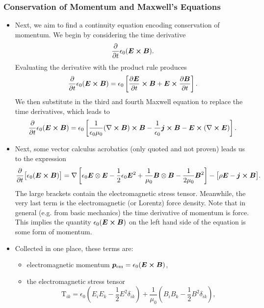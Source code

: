 \documentclass[11pt, a4paper]{article}
\renewcommand{\vec}[1]{\bm{#1}} %
\newcommand{\E}{\vec{E}} %
\newcommand{\B}{\vec{B}} %
\newcommand{\TT}{\mathrm{T}}  %
\newcommand{\ee}{\epsilon_{0}}  %
\newcommand{\mm}{\mu_{0}}  %
\renewcommand{\j}{\vec{j}}  %
\renewcommand{\curl}{\nabla \cross}
\renewcommand{\grad}{\nabla}
\begin{document}
\subsubsection{Conservation of Momentum and Maxwell's Equations}
\begin{itemize}
	\item Next, we aim to find a continuity equation encoding conservation of momentum. We begin by considering the time derivative
	\begin{equation*}
		\pdv{t}\ee (\E \cross \B).
	\end{equation*}
	Evaluating the derivative with the product rule produces
	\begin{equation*}
		\pdv{t}\ee (\E \cross \B) = \ee \left[\pdv{\E}{t}\cross \B + \E \cross \pdv{\B}{t}\right].
	\end{equation*}
	We then substitute in the third and fourth Maxwell equation to replace the time derivatives, which leads to
	\begin{equation*}
		\pdv{t}\ee (\E \cross \B) = \ee \left[\frac{1}{\ee \mm}(\curl \B)\cross \B - \frac{1}{\ee}\j \cross \B - \E \cross (\curl \E)\right].
	\end{equation*}
	
    \item Next, some vector calculus acrobatics (only quoted and not proven) leads us to the expression
	\begin{equation*}
		\pdv{t}\big[\ee (\E \cross \B)\big] = \grad \left[\ee \E \otimes \E - \frac{1}{2}\ee \E^{2} + \frac{1}{\mm} \B \otimes \B - \frac{1}{2\mm}\B^{2}\right] - \big[\rho \E - \j \cross \B\big].
	\end{equation*}
	The large brackets contain the electromagnetic stress tensor. Meanwhile, the very last term is the electromagnetic (or Lorentz) force density. Note that in general (e.g. from basic mechanics) the time derivative of momentum is force. This implies the quantity $ \ee (\E \cross \B) $ on the left hand side of the equation is some form of momentum.
	
	\item Collected in one place, these terms are:
    \begin{itemize}
        \item electromagnetic momentum $ \vec{p}_{\text{em}} = \ee (\E \cross \B) $,

        \item the electromagnetic stress tensor 
        \begin{equation*}
            \TT_{ik} = \ee \left(E_{i}E_{k} - \frac{1}{2}E^{2}\delta_{ik}\right) + \frac{1}{\mm}\left(B_{i}B_{k} - \frac{1}{2}B^{2}\delta_{ik}\right),
        \end{equation*}
        

\end{itemize}
\end{itemize}
\end{document}
